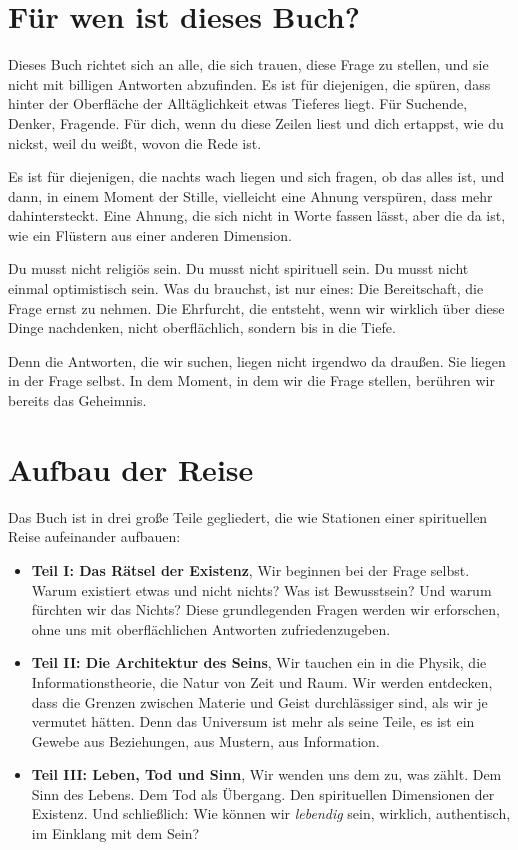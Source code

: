 \section{Für wen ist dieses Buch?}

Dieses Buch richtet sich an alle, die sich trauen, diese Frage zu stellen, und sie nicht mit billigen Antworten abzufinden. Es ist für diejenigen, die spüren, dass hinter der Oberfläche der Alltäglichkeit etwas Tieferes liegt. Für Suchende, Denker, Fragende. Für dich, wenn du diese Zeilen liest und dich ertappst, wie du nickst, weil du weißt, wovon die Rede ist.

Es ist für diejenigen, die nachts wach liegen und sich fragen, ob das alles ist, und dann, in einem Moment der Stille, vielleicht eine Ahnung verspüren, dass mehr dahintersteckt. Eine Ahnung, die sich nicht in Worte fassen lässt, aber die da ist, wie ein Flüstern aus einer anderen Dimension.

Du musst nicht religiös sein. Du musst nicht spirituell sein. Du musst nicht einmal optimistisch sein. Was du brauchst, ist nur eines: Die Bereitschaft, die Frage ernst zu nehmen. Die Ehrfurcht, die entsteht, wenn wir wirklich über diese Dinge nachdenken, nicht oberflächlich, sondern bis in die Tiefe.

Denn die Antworten, die wir suchen, liegen nicht irgendwo da draußen. Sie liegen in der Frage selbst. In dem Moment, in dem wir die Frage stellen, berühren wir bereits das Geheimnis.

\section{Aufbau der Reise}

Das Buch ist in drei große Teile gegliedert, die wie Stationen einer spirituellen Reise aufeinander aufbauen:

\begin{itemize}
	\item \textbf{Teil I: Das Rätsel der Existenz}, Wir beginnen bei der Frage selbst. Warum existiert etwas und nicht nichts? Was ist Bewusstsein? Und warum fürchten wir das Nichts? Diese grundlegenden Fragen werden wir erforschen, ohne uns mit oberflächlichen Antworten zufriedenzugeben.

	\item \textbf{Teil II: Die Architektur des Seins}, Wir tauchen ein in die Physik, die Informationstheorie, die Natur von Zeit und Raum. Wir werden entdecken, dass die Grenzen zwischen Materie und Geist durchlässiger sind, als wir je vermutet hätten. Denn das Universum ist mehr als seine Teile, es ist ein Gewebe aus Beziehungen, aus Mustern, aus Information.

	\item \textbf{Teil III: Leben, Tod und Sinn}, Wir wenden uns dem zu, was zählt. Dem Sinn des Lebens. Dem Tod als Übergang. Den spirituellen Dimensionen der Existenz. Und schließlich: Wie können wir \emph{lebendig} sein, wirklich, authentisch, im Einklang mit dem Sein?
\end{itemize}

